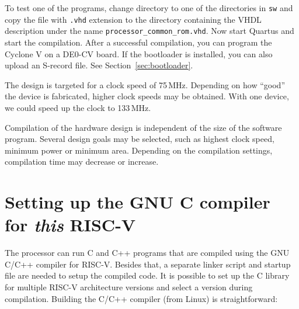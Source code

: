 \documentclass[12pt]{article}
\begin{document}
To test one of the programs, change directory to one of the directories in \lstinline|sw| and copy the file with \lstinline|.vhd| extension to the directory containing the VHDL description under the name \lstinline|processor_common_rom.vhd|.
Now start Quartus and start the compilation. After a successful compilation, you can program the Cyclone V on a DE0-CV board. If the bootloader is installed, you can also upload an S-record file. See Section~\ref{sec:bootloader}.

The design is targeted for a clock speed of 75\,MHz. Depending on how ``good'' the device is fabricated, higher clock speeds may be obtained. With one device, we could speed up the clock to 133\,MHz.

Compilation of the hardware design is independent of the size of the software program. Several design goals may be selected, such as highest clock speed, minimum power or minimum area. Depending on the compilation settings, compilation time may decrease or increase.


\section{Setting up the GNU C compiler for \textit{this} RISC-V}
\label{sec:ccompiler}
The processor can run C and C++ programs that are compiled using the GNU C/C++ compiler for RISC-V. Besides that, a separate linker script and startup file are needed to setup the compiled code. It is possible to set up the C library for multiple RISC-V architecture versions and select a version during compilation. Building the C/C++ compiler (from Linux) is straightforward:
\end{document}
